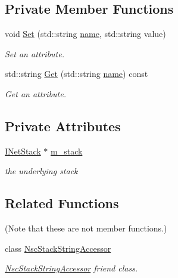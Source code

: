 \subsection*{Private Member Functions}
\begin{DoxyCompactItemize}
\item 
void \hyperlink{classns3_1_1Ns3NscStack_a92ed688d99915ddd299ad15c424140a9}{Set} (std\+::string \hyperlink{generate__test__data__lte__spectrum__model_8m_ab74e6bf80237ddc4109968cedc58c151}{name}, std\+::string value)
\begin{DoxyCompactList}\small\item\em Set an attribute. \end{DoxyCompactList}\item 
std\+::string \hyperlink{classns3_1_1Ns3NscStack_ad668e0c95e2ca6a38ef85b70c072d296}{Get} (std\+::string \hyperlink{generate__test__data__lte__spectrum__model_8m_ab74e6bf80237ddc4109968cedc58c151}{name}) const 
\begin{DoxyCompactList}\small\item\em Get an attribute. \end{DoxyCompactList}\end{DoxyCompactItemize}
\subsection*{Private Attributes}
\begin{DoxyCompactItemize}
\item 
\hyperlink{structINetStack}{I\+Net\+Stack} $\ast$ \hyperlink{classns3_1_1Ns3NscStack_a2de1abd9c5f7bca7321570353649ef93}{m\+\_\+stack}
\begin{DoxyCompactList}\small\item\em the underlying stack \end{DoxyCompactList}\end{DoxyCompactItemize}
\subsection*{Related Functions}
(Note that these are not member functions.) \begin{DoxyCompactItemize}
\item 
class \hyperlink{classns3_1_1Ns3NscStack_a65574a3a244d1d85dbf907e4a6a9f639}{Nsc\+Stack\+String\+Accessor}
\begin{DoxyCompactList}\small\item\em \hyperlink{classns3_1_1NscStackStringAccessor}{Nsc\+Stack\+String\+Accessor} friend class. \end{DoxyCompactList}\end{DoxyCompactItemize}

